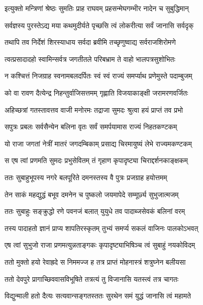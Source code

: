 
\twolineshloka
{इत्युक्तो मन्त्रिणां श्रेष्ठः सुमतिः प्राह राघवम्}
{प्रहसन्मेघगम्भीर नादेन च सुबुद्धिमान्}%


\twolineshloka
{सर्वज्ञस्य पुरस्तेऽद्य मया कथमुदीर्यते}
{पृच्छसि त्वं लोकरीत्या सर्वं जानासि सर्वदृक्}%

\twolineshloka
{तथापि तव निर्देशं शिरस्याधाय सर्वदा}
{ब्रवीमि तच्छृणुष्वाद्य सर्वराजशिरोमणे}%

\twolineshloka
{त्वत्प्रसादादहो स्वामिन्सर्वत्र जगतीतले}
{परिबभ्राम ते वाहो भालपत्रसुशोभितः}%

\twolineshloka
{न कश्चित्तं निजग्राह स्वनामबलदर्पितः}
{स्वं स्वं राज्यं समर्प्याथ प्रणेमुस्ते पदाम्बुजम्}%

\twolineshloka
{को वा रावण दैत्येन्द्र निहन्तुर्वाजिसत्तमम्}
{गृह्णाति विजयाकाङ्क्षी जरामरणवर्जितः}%

\twolineshloka
{अहिच्छत्रां गतस्तावत्तव वाजी मनोरमः}
{तद्राजा सुमदः श्रुत्वा हयं प्राप्तं तव प्रभो}%

\twolineshloka
{सपुत्रः प्रबलः सर्वसैन्येन बलिना वृतः}
{सर्वं समर्पयामास राज्यं निहतकण्टकम्}%

\twolineshloka
{यो राजा जगतां नेत्रीं मातरं जगदम्बिकाम्}
{प्रसाद्य चिरमायुष्यं लेभे राज्यमकण्टकम्}%

\twolineshloka
{स एष त्वां प्रणमति सुमदः प्रभुसेवितम्}
{तं गृहाण कृपादृष्ट्या चिराद्दर्शनकाङ्क्षकम्}%

\twolineshloka
{ततः सुबाहुभूपस्य नगरे बलपूरिते}
{दमनस्तस्य वै पुत्रः प्रजग्राह हयोत्तमम्}%

\twolineshloka
{तेन साकं महद्युद्धं बभूव दमनेन च}
{पुष्कलो जयमापेदे सम्मूर्छ्य सुभुजात्मजम्}%

\twolineshloka
{ततः सुबाहुः सङ्क्रुद्धो रणे पवनजं बलात्}
{युयुधे तव पादाब्जसेवकं बलिनां वरम्}%

\twolineshloka
{तस्य पादाहतो ज्ञानं प्राप्य शापतिरस्कृतम्}
{तुभ्यं समर्प्य सकलं वाजिनः पालकोऽभवत्}%

\twolineshloka
{एष त्वां सुभुजो राजा प्रणमत्युन्नताङ्गकः}
{कृपादृष्ट्याभिषिञ्च त्वं सुबाहुं नयकोविदम्}%

\twolineshloka
{ततो मुक्तो हयो रेवाह्रदे स निममज्ज ह}
{तत्र प्राप्तं मोहनास्त्रं शत्रुघ्नेन बलीयसा}%

\twolineshloka
{ततो देवपुरे प्रागाच्छिववासविभूषिते}
{तत्रत्यं तु विजानासि यतस्त्वं तत्र चागतः}%

\twolineshloka
{विद्युन्माली हतो दैत्यः सत्यवान्सङ्गतस्ततः}
{सुरथेन समं युद्धं जानासि त्वं महामते}%


